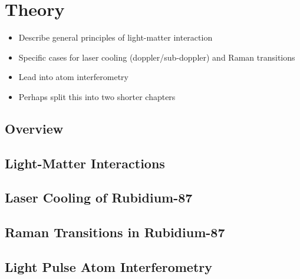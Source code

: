 \chapter{Theory}\label{chap:theory}
\begin{itemize}
    \item Describe general principles of light-matter interaction
    \item Specific cases for laser cooling (doppler/sub-doppler) and Raman transitions 
    \item Lead into atom interferometry
    \item Perhaps split this into two shorter chapters 
\end{itemize}
\section{Overview}\label{sec:theory_overview}
\section{Light-Matter Interactions}\label{sec:theory_lmi}
\section{Laser Cooling of Rubidium-87}
\section{Raman Transitions in Rubidium-87}\label{sec:theory_raman}
\section{Light Pulse Atom Interferometry}\label{sec:theory_atomint}
